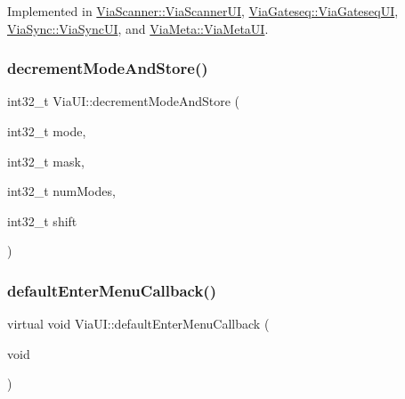 Implemented in \mbox{\hyperlink{class_via_scanner_1_1_via_scanner_u_i_a2d8bc6b636e934c0945a09e115476ec3}{Via\+Scanner\+::\+Via\+Scanner\+UI}}, \mbox{\hyperlink{class_via_gateseq_1_1_via_gateseq_u_i_a745d2eed3bc66bd2bb44149cb54cbd39}{Via\+Gateseq\+::\+Via\+Gateseq\+UI}}, \mbox{\hyperlink{class_via_sync_1_1_via_sync_u_i_a553dc53213d1b4b62d7aead58533c511}{Via\+Sync\+::\+Via\+Sync\+UI}}, and \mbox{\hyperlink{class_via_meta_1_1_via_meta_u_i_a8b8724e5d68649da49f3f99203257833}{Via\+Meta\+::\+Via\+Meta\+UI}}.

\mbox{\label{class_via_u_i_a85d24875e904ac7cf63f0762e1ccb3c0}} 
\subsubsection{\texorpdfstring{decrement\+Mode\+And\+Store()}{decrementModeAndStore()}}
{\footnotesize\ttfamily int32\+\_\+t Via\+U\+I\+::decrement\+Mode\+And\+Store (\begin{DoxyParamCaption}\item[{int32\+\_\+t}]{mode,  }\item[{int32\+\_\+t}]{mask,  }\item[{int32\+\_\+t}]{num\+Modes,  }\item[{int32\+\_\+t}]{shift }\end{DoxyParamCaption})}

\mbox{\label{class_via_u_i_a226eb7b65b6035a611dd734d965fa7c2}} 
\subsubsection{\texorpdfstring{default\+Enter\+Menu\+Callback()}{defaultEnterMenuCallback()}}
{\footnotesize\ttfamily virtual void Via\+U\+I\+::default\+Enter\+Menu\+Callback (\begin{DoxyParamCaption}\item[{void}]{ }\end{DoxyParamCaption})\hspace{0.3cm}{\ttfamily [pure virtual]}}



